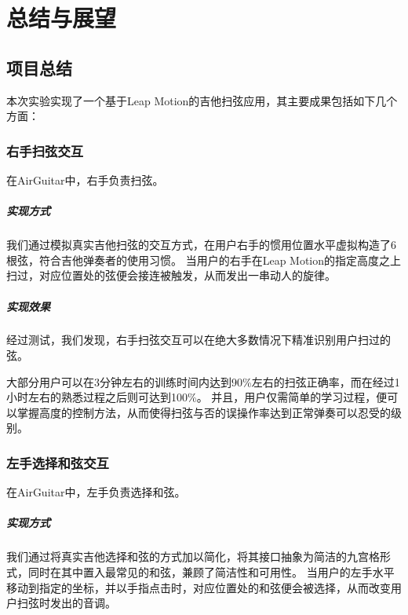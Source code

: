 \chapter{总结与展望}

    \section{项目总结}
    本次实验实现了一个基于Leap Motion的吉他扫弦应用，其主要成果包括如下几个方面：

        \subsection{右手扫弦交互}
        在AirGuitar中，右手负责扫弦。

            \paragraph{实现方式} 我们通过模拟真实吉他扫弦的交互方式，在用户右手的惯用位置水平虚拟构造了6根弦，符合吉他弹奏者的使用习惯。
            当用户的右手在Leap Motion的指定高度之上扫过，对应位置处的弦便会接连被触发，从而发出一串动人的旋律。

            \paragraph{实现效果} 经过测试，我们发现，右手扫弦交互可以在绝大多数情况下精准识别用户扫过的弦。

            大部分用户可以在3分钟左右的训练时间内达到90\%左右的扫弦正确率，而在经过1小时左右的熟悉过程之后则可达到100\%。
            并且，用户仅需简单的学习过程，便可以掌握高度的控制方法，从而使得扫弦与否的误操作率达到正常弹奏可以忍受的级别。

        \subsection{左手选择和弦交互}
        在AirGuitar中，左手负责选择和弦。

            \paragraph{实现方式} 我们通过将真实吉他选择和弦的方式加以简化，将其接口抽象为简洁的九宫格形式，同时在其中置入最常见的和弦，兼顾了简洁性和可用性。
            当用户的左手水平移动到指定的坐标，并以手指点击时，对应位置处的和弦便会被选择，从而改变用户扫弦时发出的音调。%

